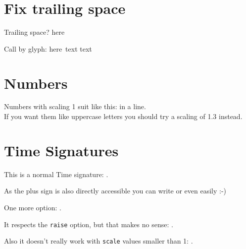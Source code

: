 \documentclass{scrartcl}
\begin{document}
\section*{Fix trailing space}
Trailing space?  here

Call by glyph:  here\
\flat* text \flat text




\section*{Numbers}
Numbers with scaling 1 suit like this:  in a line.\\
If you want them like uppercase letters you should try a scaling of  1.3 instead.

\section*{Time Signatures}
	This is a normal Time signature: .
	
	As the plus sign is also directly accessible you can write 
	 or even	
	 easily :-)
	
	One more option: \lilyText{+}. 

	It respects the \texttt{raise} option, but that makes no sense: .
	
	Also it doesn't really work with \texttt{scale} values smaller than 1:
	\lilyTimeSignature[scale=.5]{3}{4}.

	
\end{document}
